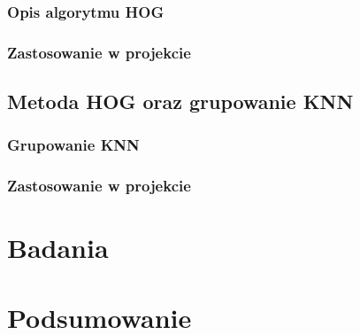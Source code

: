 \documentclass[a4paper,twoside,12pt]{book}
\newcounter{stronyPozaNumeracja}
\begin{document}
    \subsection{Opis algorytmu HOG}\label{subsec:opis-algorytmu-hog}
    \subsection{Zastosowanie w projekcie}\label{subsec:zastosowanie-w-projekcie2}

    \section{Metoda HOG oraz grupowanie KNN}\label{sec:metoda-hog-oraz-grupowanie-knn}
    \subsection{Grupowanie KNN}\label{subsec:grupowanie-knn}
    \subsection{Zastosowanie w projekcie}\label{subsec:zastosowanie-w-projekcie}
    \chapter{Badania}\label{ch:badania}
    \chapter{Podsumowanie}\label{ch:podsumowanie}



    \backmatter
    \setcounter{page}{\value{stronyPozaNumeracja}}

    \pagestyle{tylkoNumeryStron}

    
    

\end{document}

